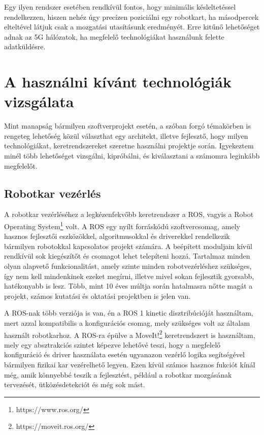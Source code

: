 \documentclass[11pt,a4paper,oneside]{article}
\begin{document}
Egy ilyen rendszer esetében rendkívül fontos, hogy minimális késleltetéssel rendelkezzen, hiszen nehéz úgy precízen poziciálni egy robotkart, ha másodpercek elteltével látjuk csak a mozgatási utasításunk eredményét. Erre kitűnő lehetőséget adnak az 5G hálózatok, ha megfelelő technológiákat használunk felette adatküldésre.

\newpage

\section{A használni kívánt technológiák vizsgálata}

Mint manapság bármilyen szoftverprojekt esetén, a szóban forgó témakörben is rengeteg lehetőség közül választhat egy architekt, illetve fejlesztő, hogy milyen technológiákat, keretrendszereket szeretne használni projektje során. Igyekeztem minél több lehetőséget vizsgálni, kipróbálni, és kiválasztani a számomra leginkább megfelelőt.

\subsection{Robotkar vezérlés}

A robotkar vezérléséhez a legkézenfekvőbb keretrendszer a ROS, vagyis a Robot Operating System\footnote{https://www.ros.org/} volt. A ROS egy nyílt forráskódú szoftvercsomag, amely hasznos fejlesztői eszközökkel, algoritmusokkal és driverekkel rendelkezik bármilyen robotokkal kapcsolatos projekt számára. A beépített moduljain kívül rendkívül sok kiegészítőt és csomagot lehet telepíteni hozzá. Tartalmaz minden olyan alapvető funkcionalitást, amely szinte minden robotvezérléshez szükséges, így nem kell mindenkinek ezeket megírni, illetve mivel sokan fejlesztik gyorsabb, hatékonyabb is lesz. Több, mint 10 éves múltja során hatalmasra nőtte magát a projekt, számos kutatási és oktatási projektben is jelen van.

A ROS-nak több verziója is van, én a ROS 1 kinetic disztribúcióját használtam, mert azzal kompatibilis a konfigurációs csomag, mely szükséges volt az általam használt robotkarhoz. A ROS-ra épülve a MoveIt!\footnote{https://moveit.ros.org/} keretrendszert is használtam, mely egy absztrakciós szintet képezve lehetővé teszi, hogy a megfelelő konfiguráció és driver használata esetén ugyanazon vezérlő logika segítségével bármilyen fizikai kar vezérelhető legyen. Ezen kívül számos hasznos fukciót kínál még, amik könnyebbé teszik a fejlesztést, például a robotkar mozgásának tervezését, ütközésdetekciót és még sok mást.
\end{document}
